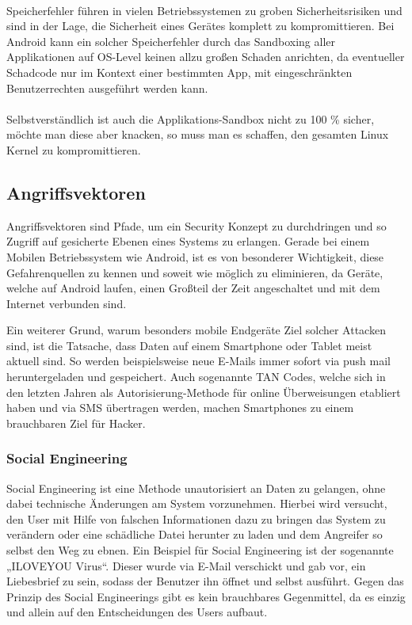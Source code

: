 \paragraph*{}
Speicherfehler führen in vielen Betriebssystemen zu groben Sicherheitsrisiken und sind in der Lage, die Sicherheit eines Gerätes komplett zu kompromittieren. Bei Android kann ein solcher Speicherfehler durch das Sandboxing aller Applikationen auf OS-Level keinen allzu großen Schaden anrichten, da eventueller Schadcode nur im Kontext einer bestimmten App, mit eingeschränkten Benutzerrechten ausgeführt werden kann.
\paragraph*{}
Selbstverständlich ist auch die Applikations-Sandbox nicht zu 100 \% sicher, möchte man diese aber knacken, so muss man es schaffen, den gesamten Linux Kernel zu kompromittieren.
	
\subsection{Angriffsvektoren}
Angriffsvektoren sind Pfade, um ein Security Konzept zu durchdringen und so Zugriff auf gesicherte Ebenen eines Systems zu erlangen. Gerade bei einem Mobilen Betriebssystem wie Android, ist es von besonderer Wichtigkeit, diese Gefahrenquellen zu kennen und soweit wie möglich zu eliminieren, da Geräte, welche auf Android laufen, einen Großteil der Zeit angeschaltet und mit dem Internet verbunden sind. \par
Ein weiterer Grund, warum besonders mobile Endgeräte Ziel solcher Attacken sind, ist die Tatsache, dass Daten auf einem Smartphone oder Tablet meist aktuell sind. So werden beispielsweise neue E-Mails immer sofort via push mail heruntergeladen und gespeichert. Auch sogenannte TAN Codes, welche sich in den letzten Jahren als Autorisierung-Methode für online Überweisungen etabliert haben und via SMS übertragen werden, machen Smartphones zu einem brauchbaren Ziel für Hacker.
\subsubsection{Social Engineering}
Social Engineering ist eine Methode unautorisiert an Daten zu gelangen, ohne dabei technische Änderungen am System vorzunehmen. Hierbei wird versucht, den User mit Hilfe von falschen Informationen dazu zu bringen das System zu verändern oder eine schädliche Datei herunter zu laden und dem Angreifer so selbst den Weg zu ebnen. Ein Beispiel für Social Engineering ist der sogenannte „ILOVEYOU Virus“. Dieser wurde via E-Mail verschickt und gab vor, ein Liebesbrief zu sein, sodass der Benutzer ihn öffnet und selbst ausführt.
Gegen das Prinzip des Social Engineerings gibt es kein brauchbares Gegenmittel, da es einzig und allein auf den Entscheidungen des Users aufbaut.
\newpage
